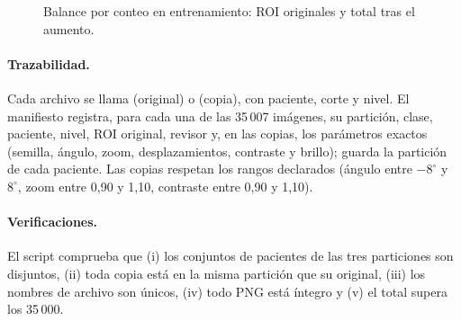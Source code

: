 \begin{figure}[t]
\centering
{}
\caption{Balance por conteo en entrenamiento: ROI originales y total tras el aumento.}
\label{fig:balance}
\end{figure}

\paragraph{Trazabilidad.} Cada archivo se llama  (original) o  (copia), con paciente, corte y nivel. El manifiesto  registra, para cada una de las 35\,007 imágenes, su partición, clase, paciente, nivel, ROI original, revisor y, en las copias, los parámetros exactos (semilla, ángulo, zoom, desplazamientos, contraste y brillo);  guarda la partición de cada paciente. Las copias respetan los rangos declarados (ángulo entre $-8^{\circ}$ y $8^{\circ}$, zoom entre 0,90 y 1,10, contraste entre 0,90 y 1,10).

\paragraph{Verificaciones.} El script comprueba que (i) los conjuntos de pacientes de las tres particiones son disjuntos, (ii) toda copia está en la misma partición que su original, (iii) los nombres de archivo son únicos, (iv) todo PNG está íntegro y (v) el total supera los 35\,000.

